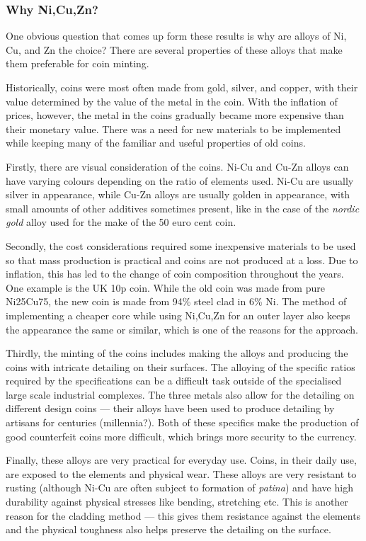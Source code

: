 \documentclass[11pt,a4paper,twoside,onecolumn]{article}
\begin{document}
\subsubsection{Why Ni,Cu,Zn?}
One obvious question that comes up form these results is why are alloys of Ni, Cu, and Zn the choice? There are several properties of these alloys that make them preferable for coin minting.

Historically, coins were most often made from gold, silver, and copper, with their value determined by the value of the metal in the coin. With the inflation of prices, however, the metal in the coins gradually became more expensive than their monetary value. There was a need for new materials to be implemented while keeping many of the familiar and useful properties of old coins.

Firstly, there are visual consideration of the coins. Ni-Cu and Cu-Zn alloys can have varying colours depending on the ratio of elements used. Ni-Cu are usually silver in appearance, while Cu-Zn alloys are usually golden in appearance, with small amounts of other additives sometimes present, like in the case of the \emph{nordic gold} alloy used for the make of the 50 euro cent coin.

Secondly, the cost considerations required some inexpensive materials to be used so that mass production is practical and coins are not produced at a loss. Due to inflation, this has led to the change of coin composition throughout the years. One example is the UK 10p coin. While the old coin was made from pure Ni25Cu75, the new coin is made from 94\% steel clad in 6\% Ni. The method of implementing a cheaper core while using Ni,Cu,Zn for an outer layer also keeps the appearance the same or similar, which is one of the reasons for the approach.

Thirdly, the minting of the coins includes making the alloys and producing the coins with intricate detailing on their surfaces. The alloying of the specific ratios required by the specifications can be a difficult task outside of the specialised large scale industrial complexes. The three metals also allow for the detailing on different design coins --- their alloys have been used to produce detailing by artisans for centuries (millennia?). Both of these specifics make the production of good counterfeit coins more difficult, which brings more security to the currency.

Finally, these alloys are very practical for everyday use. Coins, in their daily use, are exposed to the elements and physical wear. These alloys are very resistant to rusting (although Ni-Cu are often subject to formation of \emph{patina}) and have high durability against physical stresses like bending, stretching etc. This is another reason for the cladding method --- this gives them resistance against the elements and the physical toughness also helps preserve the detailing on the surface.
\end{document}
